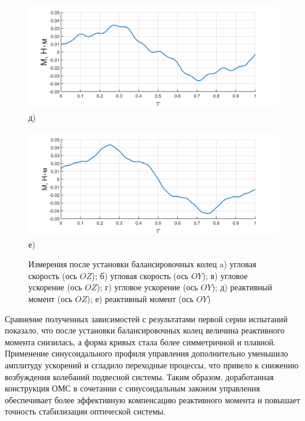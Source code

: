 \begin{figure}[h!]
	\begin{minipage}[b]{0.49\linewidth}\centering
		\includegraphics[width=\linewidth]{matlab/img/oz-gyro-sin-mom} \\ д)
	\end{minipage}
	\hfill
	\begin{minipage}[b]{0.49\linewidth}\centering
		\includegraphics[width=\linewidth]{matlab/img/oy-gyro-sin-mom} \\ е)
	\end{minipage}
	\vspace{0.5em} %
	\caption{Измерения после установки балансировочных колец   a) угловая скорость (ось $OZ$); б) угловая скорость (ось $OY$); в) угловое ускорение (ось $OZ$); г) угловое ускорение (ось $OY$);  д) реактивный момент (ось $OZ$); е) реактивный момент (ось $OY$)  }
	\label{fig:sin-profile-omn}
\end{figure}

Сравнение полученных зависимостей с результатами первой серии испытаний показало, что после установки балансировочных колец величина реактивного момента снизилась, а форма кривых стала более симметричной и плавной. Применение синусоидального профиля управления дополнительно уменьшило амплитуду ускорений и сгладило переходные процессы, что привело к снижению возбуждения колебаний подвесной системы. Таким образом, доработанная конструкция ОМС в сочетании с синусоидальным законом управления обеспечивает более эффективную компенсацию реактивного момента и повышает точность стабилизации оптической системы.

